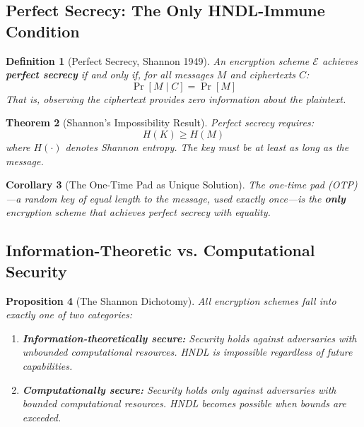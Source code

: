 \documentclass[11pt,a4paper]{article}
\newtheorem{theorem}{Theorem}[section]
\newtheorem{proposition}[theorem]{Proposition}
\newtheorem{corollary}[theorem]{Corollary}
\newtheorem{definition}[theorem]{Definition}
\begin{document}
\subsection{Perfect Secrecy: The Only HNDL-Immune Condition}

\begin{definition}[Perfect Secrecy, Shannon 1949]
An encryption scheme $\mathcal{E}$ achieves \textbf{perfect secrecy} if and only if, for all messages $M$ and ciphertexts $C$:
\begin{equation}
\Pr[M \mid C] = \Pr[M]
\end{equation}
That is, observing the ciphertext provides \textit{zero information} about the plaintext.
\end{definition}

\begin{theorem}[Shannon's Impossibility Result]
Perfect secrecy requires:
\begin{equation}
H(K) \geq H(M)
\end{equation}
where $H(\cdot)$ denotes Shannon entropy. The key must be at least as long as the message.
\end{theorem}

\begin{corollary}[The One-Time Pad as Unique Solution]
The one-time pad (OTP)---a random key of equal length to the message, used exactly once---is the \textbf{only} encryption scheme that achieves perfect secrecy with equality.
\end{corollary}

\subsection{Information-Theoretic vs. Computational Security}

\begin{proposition}[The Shannon Dichotomy]
All encryption schemes fall into exactly one of two categories:
\begin{enumerate}[noitemsep]
    \item \textbf{Information-theoretically secure:} Security holds against adversaries with \textit{unbounded} computational resources. HNDL is \textit{impossible} regardless of future capabilities.
    \item \textbf{Computationally secure:} Security holds only against adversaries with \textit{bounded} computational resources. HNDL becomes possible when bounds are exceeded.
\end{enumerate}
\end{proposition}
\end{document}
